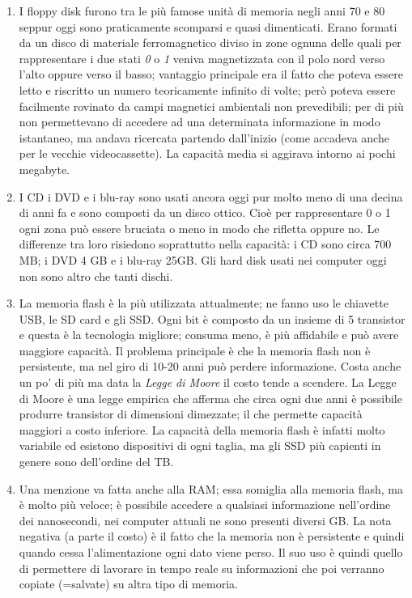 \begin{enumerate}
\item I floppy disk furono tra le più famose unità di memoria negli anni 70 e 80 seppur oggi sono praticamente scomparsi e quasi dimenticati. Erano formati da un disco di materiale ferromagnetico diviso in zone ognuna delle quali per rappresentare i due stati \textit{0} o \textit{1} veniva magnetizzata con il polo nord verso l'alto oppure verso il basso; vantaggio principale era il fatto che poteva essere letto e riscritto un numero teoricamente infinito di volte; però poteva essere facilmente rovinato da campi magnetici ambientali non prevedibili; per di più non permettevano di accedere ad una determinata informazione in modo istantaneo, ma andava ricercata partendo dall'inizio (come accadeva anche per le vecchie videocassette). La capacità media si aggirava intorno ai pochi megabyte.
\item I CD i DVD e i blu-ray sono usati ancora oggi pur molto meno di una decina di anni fa e sono composti da un disco ottico. Cioè per rappresentare 0 o 1 ogni zona può essere bruciata o meno in modo che rifletta oppure no. Le differenze tra loro risiedono soprattutto nella capacità: i CD sono circa 700 MB; i DVD 4 GB e i blu-ray 25GB. Gli hard disk usati nei computer oggi non sono altro che tanti dischi.
\item La memoria flash è la più utilizzata attualmente; ne fanno uso le chiavette USB, le SD card e gli SSD. Ogni bit è composto da un insieme di 5 transistor e questa è la tecnologia migliore; consuma meno, è più affidabile e può avere maggiore capacità. Il problema principale è che la memoria flash non è persistente, ma nel giro di 10-20 anni può perdere informazione. Costa anche un po' di più ma data la \textit{Legge di Moore} il costo tende a scendere. La Legge di Moore è una legge empirica che afferma che circa ogni due anni è possibile produrre transistor di dimensioni dimezzate; il che permette capacità maggiori a costo inferiore. La capacità della memoria flash è infatti molto variabile ed esistono dispositivi di ogni taglia, ma gli SSD più capienti in genere sono dell'ordine del TB.
\item Una menzione va fatta anche alla RAM; essa somiglia alla memoria flash, ma è molto più veloce; è possibile accedere a qualsiasi informazione nell'ordine dei nanosecondi, nei computer attuali ne sono presenti diversi GB. La nota negativa (a parte il costo) è il fatto che la memoria non è persistente e quindi quando cessa l'alimentazione ogni dato viene perso. Il suo uso è quindi quello di permettere di lavorare in tempo reale su informazioni che poi verranno copiate (=salvate) su altra tipo di memoria.
\end{enumerate}
